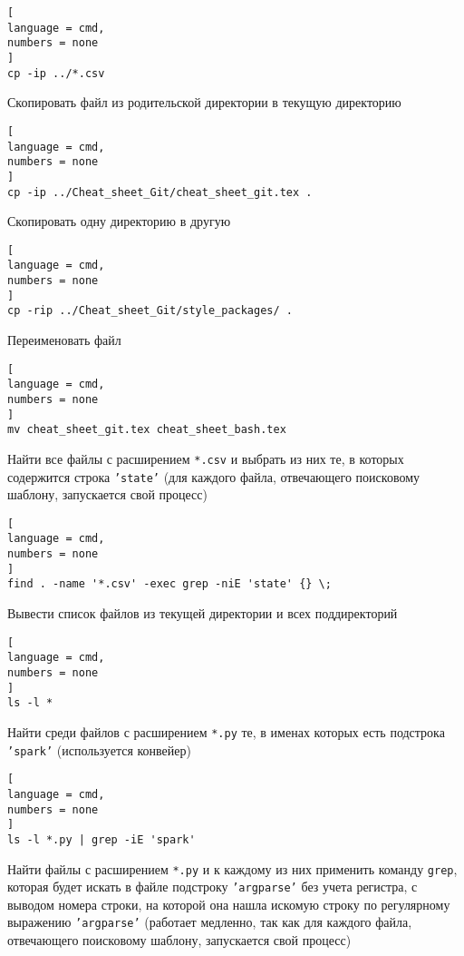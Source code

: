 \documentclass[%
	11pt,
	a4paper,
	utf8,
		]{article}
\begin{document}
\begin{lstlisting}[
language = cmd,
numbers = none
]
cp -ip ../*.csv
\end{lstlisting}

Скопировать файл из родительской директории в текущую директорию

\begin{lstlisting}[
language = cmd,
numbers = none
]
cp -ip ../Cheat_sheet_Git/cheat_sheet_git.tex .
\end{lstlisting}

Скопировать одну директорию в другую

\begin{lstlisting}[
language = cmd,
numbers = none
]
cp -rip ../Cheat_sheet_Git/style_packages/ .
\end{lstlisting}

Переименовать файл

\begin{lstlisting}[
language = cmd,
numbers = none
]
mv cheat_sheet_git.tex cheat_sheet_bash.tex
\end{lstlisting}

Найти все файлы с расширением \texttt{*.csv} и выбрать из них те, в которых содержится строка \texttt{'state'} (для каждого файла, отвечающего поисковому шаблону, запускается свой процесс)

\begin{lstlisting}[
language = cmd,
numbers = none
]
find . -name '*.csv' -exec grep -niE 'state' {} \;
\end{lstlisting}

Вывести список файлов из текущей директории и всех поддиректорий

\begin{lstlisting}[
language = cmd,
numbers = none
]
ls -l *
\end{lstlisting}

Найти среди файлов с расширением \texttt{*.py} те, в именах которых есть подстрока \texttt{'spark'} (используется конвейер)

\begin{lstlisting}[
language = cmd,
numbers = none
]
ls -l *.py | grep -iE 'spark'
\end{lstlisting}

Найти файлы с расширением \texttt{*.py} и к каждому из них применить команду \texttt{grep}, которая будет искать в файле подстроку \texttt{'argparse'} без учета регистра, с выводом номера строки, на которой она нашла искомую строку по регулярному выражению \texttt{'argparse'} (работает {\color{deepred} медленно}, так как для каждого файла, отвечающего поисковому шаблону, запускается свой процесс)
\end{document}
